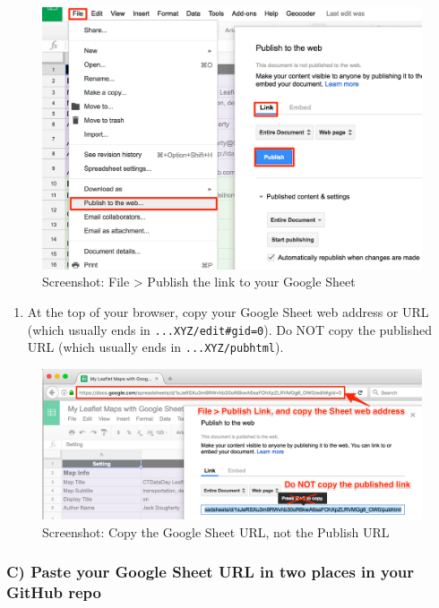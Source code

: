 \documentclass[
  english,
]{book}
\providecommand{\tightlist}{%
  \setlength{\itemsep}{0pt}\setlength{\parskip}{0pt}}
\begin{document}
\begin{figure}
\centering
\includegraphics{images/13-leaflet/lmwgs-file-publish.png}
\caption{Screenshot: File \textgreater{} Publish the link to your Google Sheet}
\end{figure}

\begin{enumerate}
\def\labelenumi{\arabic{enumi})}
\setcounter{enumi}{5}
\tightlist
\item
  At the top of your browser, copy your Google Sheet web address or URL (which usually ends in \texttt{...XYZ/edit\#gid=0}). Do NOT copy the published URL (which usually ends in \texttt{...XYZ/pubhtml}).
\end{enumerate}

\begin{figure}
\centering
\includegraphics{images/13-leaflet/lmwgs-copy-sheet-url-not-pub-url.png}
\caption{Screenshot: Copy the Google Sheet URL, not the Publish URL}
\end{figure}

\hypertarget{c-paste-your-google-sheet-url-in-two-places-in-your-github-repo}{%
\subsubsection*{C) Paste your Google Sheet URL in two places in your GitHub repo}\label{c-paste-your-google-sheet-url-in-two-places-in-your-github-repo}}
\end{document}

